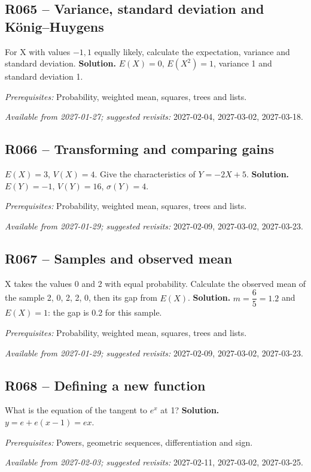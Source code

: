 \subsection*{R065 -- Variance, standard deviation and König--Huygens}\label{R065}
For X with values $-1,1$ equally likely, calculate the expectation, variance and standard deviation.
\ifmxteacher\textbf{Solution.} $E(X)=0$, $E(X^2)=1$, variance 1 and standard deviation 1.\par\textit{Prerequisites:} Probability, weighted mean, squares, trees and lists.\par\textit{Available from 2027-01-27; suggested revisits:} 2027-02-04, 2027-03-02, 2027-03-18.\fi
{}\subsection*{R066 -- Transforming and comparing gains}\label{R066}
$E(X)=3$, $V(X)=4$. Give the characteristics of $Y=-2X+5$.
\ifmxteacher\textbf{Solution.} $E(Y)=-1$, $V(Y)=16$, $\sigma(Y)=4$.\par\textit{Prerequisites:} Probability, weighted mean, squares, trees and lists.\par\textit{Available from 2027-01-29; suggested revisits:} 2027-02-09, 2027-03-02, 2027-03-23.\fi
{}\subsection*{R067 -- Samples and observed mean}\label{R067}
X takes the values 0 and 2 with equal probability. Calculate the observed mean of the sample 2, 0, 2, 2, 0, then its gap from $E(X)$.
\ifmxteacher\textbf{Solution.} $m=\dfrac{6}{5}=\num{1,2}$ and $E(X)=1$: the gap is \num{0,2} for this sample.\par\textit{Prerequisites:} Probability, weighted mean, squares, trees and lists.\par\textit{Available from 2027-01-29; suggested revisits:} 2027-02-09, 2027-03-02, 2027-03-23.\fi
{}\subsection*{R068 -- Defining a new function}\label{R068}
What is the equation of the tangent to $e^x$ at 1?
\ifmxteacher\textbf{Solution.} $y=e+e(x-1)=ex$.\par\textit{Prerequisites:} Powers, geometric sequences, differentiation and sign.\par\textit{Available from 2027-02-03; suggested revisits:} 2027-02-11, 2027-03-02, 2027-03-25.\fi
